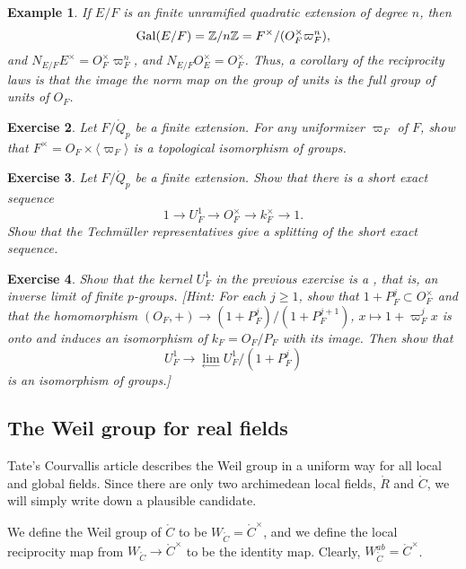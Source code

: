 \documentclass{amsart}
\newtheorem{exercise}{Exercise}
\newtheorem{example}[exercise]{Example}
\def\CC{\ring{C}}
\def\RR{\ring{R}}
\def\oG{\op{Gal}}
\begin{document}
\begin{example} If $E/F$ is an finite unramified quadratic extension of degree $n$, then
\[
\oG(E/F) = \ring{Z}/n\ring{Z} = F^\times/(O_F^\times\varpi_F^n),
\]
and $N_{E/F} E^\times = O_F^\times \varpi_F^n$, and $N_{E/F} O_E^\times = O_F^\times$.
Thus, a corollary of the reciprocity laws is that the image the norm map on the group of units
is the full group of units of $O_F$.
\end{example}

\begin{exercise}  Let $F/\ring{Q}_p$ be a finite extension.  For any uniformizer $\varpi_F$
of $F$, show that $F^\times = O_F \times \langle \varpi_F \rangle$ is a topological
isomorphism of groups.
\end{exercise}

\begin{exercise} Let $F/\ring{Q}_p$ be a finite extension.  Show that there is a short
exact sequence
\[
1 \to U_F^1 \to O_F^\times \to k^\times_F\to 1.
\]
Show that the Techm\"uller representatives give a splitting of the short exact sequence.
\end{exercise}

\begin{exercise} Show that the kernel $U_F^1$ in the previous exercise is a ,
that is, an inverse limit of finite $p$-groups.  [Hint:  For each $j\ge 1$, show that
$1+P_F^j\subset O_F^\times$ and that the homomorphism $(O_F,+)\to (1+P_F^j)/(1+P_F^{j+1})$,
 $x\mapsto 1 + \varpi^j_F x$ is onto and
induces an isomorphism of $k_F = O_F/P_F$ with its image. Then show that
\[
U^1_F \to \lim_{\leftarrow} U^1_F/(1+P_F^j)
\]
is an isomorphism of groups.]
\end{exercise}

\subsection{The Weil group for real fields}

Tate's Courvallis article describes the Weil group in a uniform way
for all local and global fields.  Since there are only two archimedean
local fields, $\RR$ and $\CC$, we will simply write down a plausible
candidate.

We define the Weil group of $\CC$ to be $W_{\CC}=\CC^\times$, and we
define the local reciprocity map from $W_{\CC}\to \CC^\times$ to be
the identity map.  Clearly, $W_{\CC}^{ab} = \CC^\times$.
\end{document}
